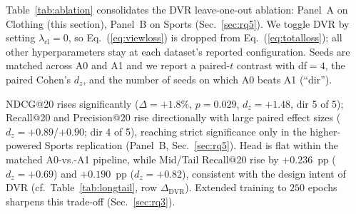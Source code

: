 \documentclass[conference]{IEEEtran}
\newcommand{\dvr}{DVR\xspace}
\begin{document}
Table~\ref{tab:ablation} consolidates the \dvr leave-one-out
ablation: Panel~A on Clothing (this section), Panel~B on Sports
(Sec.~\ref{sec:rq5}). We toggle \dvr by setting
$\lambda_{\text{cl}}{=}0$, so Eq.~(\ref{eq:viewloss}) is dropped
from Eq.~(\ref{eq:totalloss}); all other hyperparameters stay at each
dataset's reported configuration. Seeds are matched across A0 and A1
and we report a paired-$t$ contrast with df$=4$, the paired Cohen's
$d_{z}$, and the number of seeds on which A0 beats A1 (``dir'').

NDCG@20 rises significantly ($\Delta{=}+1.8\%$, $p{=}0.029$,
$d_{z}{=}+1.48$, dir 5 of 5); Recall@20 and Precision@20 rise
directionally with large paired effect sizes
($d_{z}{=}+0.89$/$+0.90$; dir 4 of 5), reaching strict significance
only in the higher-powered Sports replication (Panel~B,
Sec.~\ref{sec:rq5}). Head is flat within the matched
A0-vs.-A1 pipeline, while Mid/Tail Recall@20 rise by
$+0.236$~pp ($d_{z}{=}+0.69$) and $+0.190$~pp ($d_{z}{=}+0.82$),
consistent with the design intent of \dvr
(cf.\ Table~\ref{tab:longtail}, row $\Delta_{\text{DVR}}$).
Extended training to $250$ epochs sharpens this trade-off
(Sec.~\ref{sec:rq3}).
\end{document}
